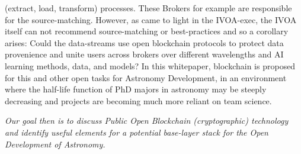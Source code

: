 \documentclass[final,5p,times,twocolumn,authoryear]{elsarticle}
\begin{document}
(extract, load, transform) processes. These Brokers for example are responsible for the source-matching. However, as came to light in the IVOA-exec, the IVOA itself can not recommend source-matching  or best-practices and so a corollary arises: Could the data-streams use open blockchain protocols to protect data provenience and unite users across brokers over different wavelengths and AI learning methods, data, and models? In this whitepaper, blockchain is proposed for this and other open tasks for Astronomy Development, in an environment where the half-life function of PhD majors in astronomy may be steeply decreasing and projects are becoming much more reliant on team science.

\emph{Our goal then is to discuss Public Open Blockchain (cryptographic) technology and identify useful elements for a potential base-layer stack for the Open Development of Astronomy.}
\end{document}
